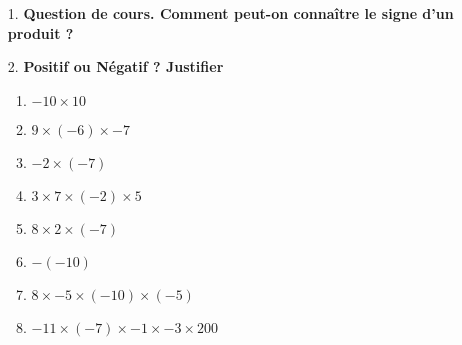 \begin{enumerate}
    \item[1.] \textbf{Question de cours. Comment peut-on connaître le signe d'un produit ?} \\
    \Pointilles[3]

    \item[2.] \textbf{Positif ou Négatif ? Justifier} 
    \begin{enumerate}
        \item $-10 \times 10$ \dotfill
        \item $9 \times (-6) \times -7$ \dotfill
        \item $-2 \times (-7)$ \dotfill
        \item $3 \times 7 \times (-2) \times 5$ \dotfill
        \item $8 \times 2 \times (-7)$ \dotfill
        \item $ -(-10)$ \dotfill
        \item $8 \times -5 \times (-10) \times (-5)$ \dotfill
        \item $-11 \times (-7) \times -1 \times -3 \times 200$ \dotfill
    \end{enumerate}
\end{enumerate}

